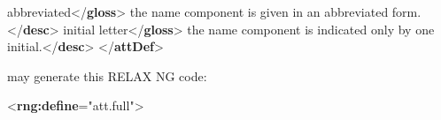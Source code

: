 \begin{shaded}
\hspace*{1em}\mbox{}\newline 
\hspace*{1em}\mbox{}\newline 
\hspace*{1em}\hspace*{1em}abbreviated{</\textbf{gloss}>}\mbox{}\newline 
\hspace*{1em}\hspace*{1em}the name component is given in an abbreviated form.{</\textbf{desc}>}\mbox{}\newline 
\hspace*{1em}\mbox{}\newline 
\hspace*{1em}\mbox{}\newline 
\hspace*{1em}\hspace*{1em}initial letter{</\textbf{gloss}>}\mbox{}\newline 
\hspace*{1em}\hspace*{1em}the name component is indicated only by one initial.{</\textbf{desc}>}\mbox{}\newline 
\hspace*{1em}\mbox{}\newline 
{}\mbox{}\newline 
{</\textbf{attDef}>}\end{shaded}\egroup\par \noindent  may generate this RELAX NG code: \par\bgroup\exampleFont \begin{shaded}\noindent\mbox{}{<\textbf{rng:define}\hspace*{1em}{name}="{att.full}">}\mbox{}\newline 

\end{shaded}
